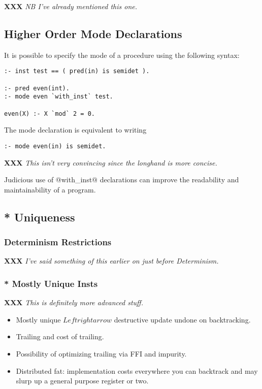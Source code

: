 \documentclass[a4paper,11pt,notitlepage,onecolumn]{article}
\newcommand{\XXX}[1]%
{{\small\textbf{XXX} \emph{#1}}}
\begin{document}
\XXX{NB I've already mentioned this one.}



\subsection{Higher Order Mode Declarations}

It is possible to specify the mode of a procedure using the
following syntax:
\begin{verbatim}
:- inst test == ( pred(in) is semidet ).

:- pred even(int).
:- mode even `with_inst` test.

even(X) :- X `mod` 2 = 0.
\end{verbatim}
The mode declaration is equivalent to writing
\begin{verbatim}
:- mode even(in) is semidet.
\end{verbatim}

\XXX{This isn't very convincing since the longhand is more concise.}

Judicious use of @with_inst@ declarations can improve the
readability and maintainability of a program.

\subsection{* Uniqueness}
\subsubsection{Determinism Restrictions}

\XXX{I've said something of this earlier on just before
Determinism.}

\subsubsection{* Mostly Unique Insts}

\XXX{This is definitely more advanced stuff.}
\begin{itemize}
\item Mostly unique $Leftrightarrow$ destructive update undone on
  backtracking.
\item Trailing and cost of trailing.
\item Possibility of optimizing trailing via FFI and impurity.
\item Distributed fat: implementation costs everywhere you can
  backtrack and may slurp up a general purpose register or
  two.
\end{itemize}
\end{document}
